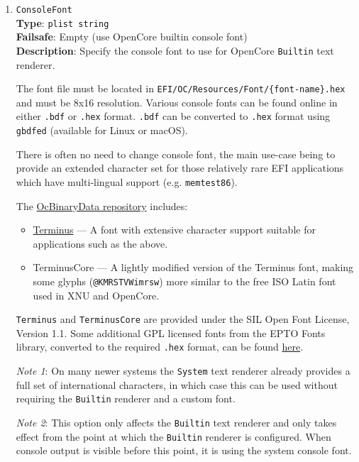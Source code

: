 \documentclass[]{article}
\providecommand{\tightlist}{%
  \setlength{\itemsep}{0pt}\setlength{\parskip}{0pt}}
\begin{document}
\begin{enumerate}
\item
  \texttt{ConsoleFont}\\
  \textbf{Type}: \texttt{plist\ string}\\
  \textbf{Failsafe}: Empty (use OpenCore builtin console font)\\
  \textbf{Description}: Specify the console font to use for OpenCore \texttt{Builtin} text renderer.

  The font file must be located in \texttt{EFI/OC/Resources/Font/\{font-name\}.hex} and must
  be 8x16 resolution. Various console fonts can be found online in either \texttt{.bdf} or
  \texttt{.hex} format. \texttt{.bdf} can be converted to \texttt{.hex} format using \texttt{gbdfed}
  (available for Linux or macOS).

  There is often no need to change console font, the main use-case being to
  provide an extended character set for those relatively rare EFI applications which
  have multi-lingual support (e.g. \texttt{memtest86}).

  The \href{https://github.com/acidanthera/OcBinaryData}{OcBinaryData repository} includes:
  \begin{itemize}
    \tightlist
    \item \href{https://terminus-font.sourceforge.net/}{Terminus} --- A font with extensive character
    support suitable for applications such as the above.
    \item TerminusCore --- A lightly modified version of the Terminus font, making some glyphs
    (\texttt{@KMRSTVWimrsw}) more similar to the free ISO Latin font used in XNU and OpenCore.
  \end{itemize}

  \texttt{Terminus} and \texttt{TerminusCore} are provided under the SIL Open Font License, Version 1.1.
  Some additional GPL licensed fonts from the EPTO Fonts library, converted
  to the required \texttt{.hex} format, can be found \href{https://github.com/mikebeaton/epto-fonts}{here}.

  \emph{Note 1}: On many newer systems the \texttt{System} text renderer already provides a full
  set of international characters, in which case this can be used without requiring the \texttt{Builtin}
  renderer and a custom font.

  \emph{Note 2}: This option only affects the \texttt{Builtin} text renderer and only takes effect from
  the point at which the \texttt{Builtin} renderer is configured. When console output is visible before
  this point, it is using the system console font.


\end{enumerate}
\end{document}
